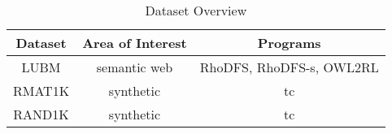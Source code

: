 \documentclass[sigconf,screen,review,natbib]{acmart}
\theoremstyle{definition}
\begin{document}
\begin{table*}
	\caption{Dataset Overview}
	\begin{tabular}{|c|c|c|}
		\hline
		Dataset & Area of Interest & Programs                 \\
		\hline
		LUBM    & semantic web     & RhoDFS, RhoDFS-s, OWL2RL \\
		\hline
		RMAT1K  & synthetic        & tc                       \\
		\hline
		RAND1K  & synthetic        & tc                       \\
		\hline
	\end{tabular}
	\label{tab:datasets}
\end{table*}
\end{document}
